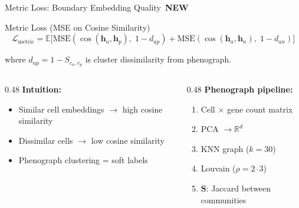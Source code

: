 \documentclass[aspectratio=169,10pt]{beamer}
\newcommand{\vect}[1]{\boldsymbol{#1}}
\newcommand{\mat}[1]{\mathbf{#1}}
\newcommand{\Lcal}{\mathcal{L}}
\newcommand{\Real}{\mathbb{R}}
\newcommand{\NEW}{\,{\scriptsize\colorbox{newgreen}{\color{white}\textbf{NEW}}}\,}
\begin{document}
\begin{frame}{Metric Loss: Boundary Embedding Quality \NEW}

\begin{block}{Metric Loss (MSE on Cosine Similarity)}
\vspace{-0.2cm}
\[
  \Lcal_{\text{metric}} = \mathbb{E}\!\big[\text{MSE}(\cos(\vect{h}_a, \vect{h}_p),\; 1 - d_{ap}) + \text{MSE}(\cos(\vect{h}_a, \vect{h}_n),\; 1 - d_{an})\big]
\]
\end{block}

where $d_{ap} = 1 - S_{c_a, c_p}$ is cluster dissimilarity from phenograph.

\vspace{0.2cm}

\begin{columns}[T]
\begin{column}{0.48\textwidth}
\textbf{Intuition:}
{\small
\begin{itemize}\setlength\itemsep{1pt}
  \item Similar cell embeddings $\to$ high cosine similarity
  \item Dissimilar cells $\to$ low cosine similarity
  \item Phenograph clustering = soft labels
\end{itemize}
}
\end{column}
\begin{column}{0.48\textwidth}
\textbf{Phenograph pipeline:}
{\small
\begin{enumerate}\setlength\itemsep{1pt}
  \item Cell $\times$ gene count matrix
  \item PCA $\to \Real^{d}$
  \item KNN graph ($k=30$)
  \item Louvain ($\rho = 2$--$3$)
  \item $\mat{S}$: Jaccard between communities
\end{enumerate}
}
\end{column}
\end{columns}
\end{frame}
\end{document}
